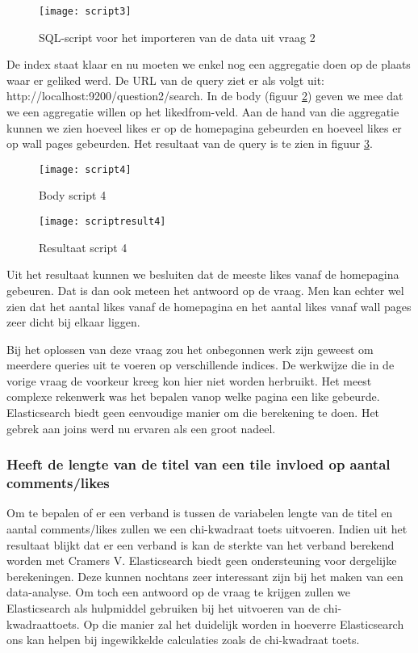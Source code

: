 \begin{figure}
	\centering
	\texttt{[image: script3]}
	\caption{SQL-script voor het importeren van de data uit vraag 2}
	\label{fig:script3}
\end{figure}

De index staat klaar en nu moeten we enkel nog een aggregatie doen op de plaats waar er geliked werd. De URL van de query ziet er als volgt uit: http://localhost:9200/question2/\textunderscore search. In de body (figuur \ref{fig:script4}) geven we mee dat we een aggregatie willen op het liked\textunderscore from-veld. Aan de hand van die aggregatie kunnen we zien hoeveel likes er op de homepagina gebeurden en hoeveel likes er op wall pages gebeurden. Het resultaat van de query is te zien in figuur \ref{fig:scriptresult4}.

\begin{figure}
	\centering
	\texttt{[image: script4]}
	\caption{Body script 4}
	\label{fig:script4}
\end{figure}

\begin{figure}
	\centering
	\texttt{[image: scriptresult4]}
	\caption{Resultaat script 4}
	\label{fig:scriptresult4}
\end{figure}

Uit het resultaat kunnen we besluiten dat de meeste likes vanaf de homepagina gebeuren. Dat is dan ook meteen het antwoord op de vraag. Men kan echter wel zien dat het aantal likes vanaf de homepagina en het aantal likes vanaf wall pages zeer dicht bij elkaar liggen. 

Bij het oplossen van deze vraag zou het onbegonnen werk zijn geweest om meerdere queries uit te voeren op verschillende indices. De werkwijze die in de vorige vraag de voorkeur kreeg kon hier niet worden herbruikt. Het meest complexe rekenwerk was het bepalen vanop welke pagina een like gebeurde. Elasticsearch biedt geen eenvoudige manier om die berekening te doen. Het gebrek aan joins werd nu ervaren als een groot nadeel.

\subsubsection{Heeft de lengte van de titel van een tile invloed op aantal comments/likes}

Om te bepalen of er een verband is tussen de variabelen lengte van de titel en aantal comments/likes zullen we een chi-kwadraat toets uitvoeren. Indien uit het resultaat blijkt dat er een verband is kan de sterkte van het verband berekend worden met Cramers V. Elasticsearch biedt geen ondersteuning voor dergelijke berekeningen. Deze kunnen nochtans zeer interessant zijn bij het maken van een data-analyse. Om toch een antwoord op de vraag te krijgen zullen we Elasticsearch als hulpmiddel gebruiken bij het uitvoeren van de chi-kwadraattoets. Op die manier zal het duidelijk worden in hoeverre Elasticsearch ons kan helpen bij ingewikkelde calculaties zoals de chi-kwadraat toets. 


